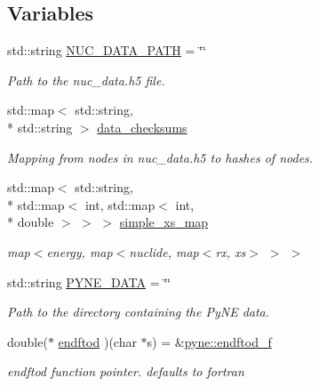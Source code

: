 \subsection*{Variables}
\begin{DoxyCompactItemize}
\item 
\hypertarget{namespacepyne_ac4b3b3dcf295d033b906bf921d820ae2}{std\-::string \hyperlink{namespacepyne_ac4b3b3dcf295d033b906bf921d820ae2}{N\-U\-C\-\_\-\-D\-A\-T\-A\-\_\-\-P\-A\-T\-H} = \char`\"{}\char`\"{}}\label{namespacepyne_ac4b3b3dcf295d033b906bf921d820ae2}

\begin{DoxyCompactList}\small\item\em Path to the nuc\-\_\-data.\-h5 file. \end{DoxyCompactList}\item 
std\-::map$<$ std\-::string, \\*
std\-::string $>$ \hyperlink{namespacepyne_a092bde815498a51a7532e3021a63ede5}{data\-\_\-checksums}
\begin{DoxyCompactList}\small\item\em Mapping from nodes in nuc\-\_\-data.\-h5 to hashes of nodes. \end{DoxyCompactList}\item 
\hypertarget{namespacepyne_a75b3d385906d5d2f078a6d099629a5c8}{std\-::map$<$ std\-::string, \\*
std\-::map$<$ int, std\-::map$<$ int, \\*
double $>$ $>$ $>$ \hyperlink{namespacepyne_a75b3d385906d5d2f078a6d099629a5c8}{simple\-\_\-xs\-\_\-map}}\label{namespacepyne_a75b3d385906d5d2f078a6d099629a5c8}

\begin{DoxyCompactList}\small\item\em map$<$energy, map$<$nuclide, map$<$rx, xs$>$ $>$ $>$ \end{DoxyCompactList}\item 
\hypertarget{namespacepyne_a7927bda45ba222dccef6e43a373b76a6}{std\-::string \hyperlink{namespacepyne_a7927bda45ba222dccef6e43a373b76a6}{P\-Y\-N\-E\-\_\-\-D\-A\-T\-A} = \char`\"{}\char`\"{}}\label{namespacepyne_a7927bda45ba222dccef6e43a373b76a6}

\begin{DoxyCompactList}\small\item\em Path to the directory containing the Py\-N\-E data. \end{DoxyCompactList}\item 
\hypertarget{namespacepyne_aa938a7defc049d691fa6d84aa2c1931e}{double($\ast$ \hyperlink{namespacepyne_aa938a7defc049d691fa6d84aa2c1931e}{endftod} )(char $\ast$s) = \&\hyperlink{namespacepyne_a14e300f1e589b42aaa451bc3cf4c70b8}{pyne\-::endftod\-\_\-f}}\label{namespacepyne_aa938a7defc049d691fa6d84aa2c1931e}

\begin{DoxyCompactList}\small\item\em endftod function pointer. defaults to fortran \end{DoxyCompactList}\end{DoxyCompactItemize}
